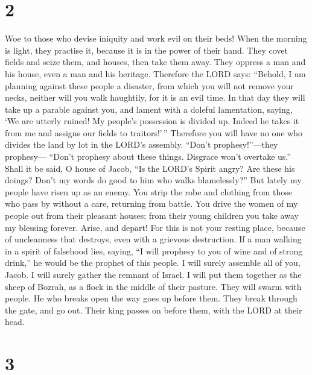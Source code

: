\hypertarget{section-1}{%
\section{2}\label{section-1}}

 Woe to those who devise iniquity and work evil on their
beds! When the morning is light, they practise it, because it is in the
power of their hand.  They covet fields and seize them, and
houses, then take them away. They oppress a man and his house, even a
man and his heritage.  Therefore the LORD says: ``Behold, I
am planning against these people a disaster, from which you will not
remove your necks, neither will you walk haughtily, for it is an evil
time.  In that day they will take up a parable against you,
and lament with a doleful lamentation, saying, `We are utterly ruined!
My people's possession is divided up. Indeed he takes it from me and
assigns our fields to traitors!'\,''  Therefore you will
have no one who divides the land by lot in the LORD's assembly.
 ``Don't prophesy!''---they prophesy--- ``Don't prophesy
about these things. Disgrace won't overtake us.''  Shall it
be said, O house of Jacob, ``Is the LORD's Spirit angry? Are these his
doings? Don't my words do good to him who walks blamelessly?''
 But lately my people have risen up as an enemy. You strip
the robe and clothing from those who pass by without a care, returning
from battle.  You drive the women of my people out from
their pleasant houses; from their young children you take away my
blessing forever.  Arise, and depart! For this is not your
resting place, because of uncleanness that destroys, even with a
grievous destruction.  If a man walking in a spirit of
falsehood lies, saying, ``I will prophesy to you of wine and of strong
drink,'' he would be the prophet of this people.  I will
surely assemble all of you, Jacob. I will surely gather the remnant of
Israel. I will put them together as the sheep of Bozrah, as a flock in
the middle of their pasture. They will swarm with people. 
He who breaks open the way goes up before them. They break through the
gate, and go out. Their king passes on before them, with the LORD at
their head.

\hypertarget{section-2}{%
\section{3}\label{section-2}}

